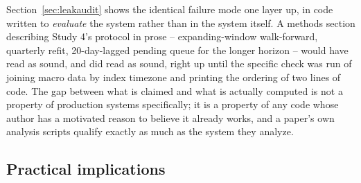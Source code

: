 \documentclass[10pt,a4paper,twocolumn]{article}
\begin{document}
Section~\ref{sec:leakaudit} shows the identical failure mode one layer up, in code written to \emph{evaluate} the system rather than in the system itself. A methods section describing Study 4's protocol in prose -- expanding-window walk-forward, quarterly refit, 20-day-lagged pending queue for the longer horizon -- would have read as sound, and did read as sound, right up until the specific check was run of joining macro data by index timezone and printing the ordering of two lines of code. The gap between what is claimed and what is actually computed is not a property of production systems specifically; it is a property of any code whose author has a motivated reason to believe it already works, and a paper's own analysis scripts qualify exactly as much as the system they analyze.

\subsection{Practical implications}
\end{document}
